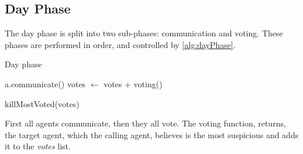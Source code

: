 \subsection{Day Phase}\label{sec:dayPhase}
The day phase is split into two sub-phases: communication and voting. These
phases are performed in order, and controlled by \cref{alg:dayPhase}.
\begin{algorithm}[H]
	\caption{Day phase}
	\begin{algorithmic}[1]
		\State a.communicate()
		\EndFor
		\State votes $\gets$ votes + voting()
		\EndFor

		\State killMostVoted(votes)
		\EndFunction
	\end{algorithmic}\label{alg:dayPhase}
\end{algorithm}
\setcounter{algorithmcaption}{1}
First all agents communicate, then they all vote. The voting function, returns, the target agent, which the calling agent, believes is the most suspicious and adds it to the \textit{votes} list.

